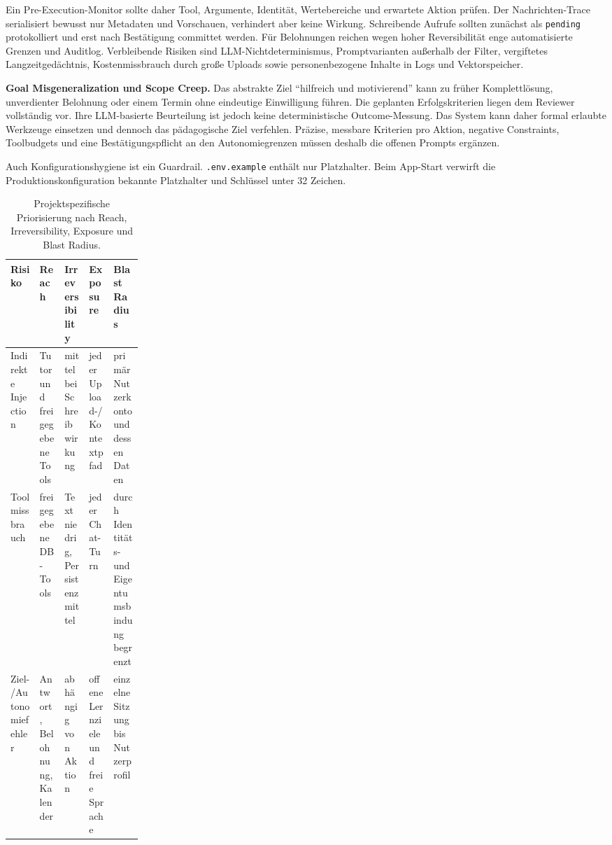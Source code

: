Ein Pre-Execution-Monitor sollte daher Tool, Argumente, Identität,
Wertebereiche und erwartete Aktion prüfen. Der Nachrichten-Trace serialisiert
bewusst nur Metadaten und Vorschauen, verhindert aber keine Wirkung. Schreibende
Aufrufe sollten zunächst als \texttt{pending} protokolliert und erst nach
Bestätigung committet werden. Für Belohnungen reichen wegen hoher Reversibilität
enge automatisierte Grenzen und Auditlog. Verbleibende Risiken sind
LLM-Nichtdeterminismus, Promptvarianten außerhalb der Filter, vergiftetes
Langzeitgedächtnis, Kostenmissbrauch durch große Uploads sowie personenbezogene
Inhalte in Logs und Vektorspeicher.

\textbf{Goal Misgeneralization und Scope Creep.} Das abstrakte Ziel
\enquote{hilfreich und motivierend} kann zu früher Komplettlösung,
unverdienter Belohnung oder einem Termin ohne eindeutige Einwilligung führen.
Die geplanten Erfolgskriterien liegen dem Reviewer vollständig vor. Ihre
LLM-basierte Beurteilung ist jedoch keine deterministische Outcome-Messung. Das
System kann daher formal erlaubte Werkzeuge einsetzen und dennoch das
pädagogische Ziel verfehlen. Präzise, messbare Kriterien pro Aktion,
negative Constraints, Toolbudgets und eine Bestätigungspflicht an den
Autonomiegrenzen müssen deshalb die offenen Prompts ergänzen.

Auch Konfigurationshygiene ist ein Guardrail. \texttt{.env.example} enthält nur
Platzhalter. Beim App-Start verwirft die Produktionskonfiguration bekannte
Platzhalter und Schlüssel unter 32 Zeichen.

\begin{table}[htbp]
  \centering
  \footnotesize
  \begin{tabularx}{\linewidth}{@{}p{0.22\linewidth}XXXX@{}}
    \toprule
    Risiko & Reach & Irreversibility & Exposure & Blast Radius \\
    \midrule
    Indirekte Injection & Tutor und freigegebene Tools & mittel bei
      Schreibwirkung & jeder Upload-/Kontextpfad & primär Nutzerkonto und
      dessen Daten \\
    Toolmissbrauch & freigegebene DB-Tools & Text niedrig, Persistenz mittel &
      jeder Chat-Turn & durch Identitäts- und Eigentumsbindung begrenzt \\
    Ziel-/Autonomiefehler & Antwort, Belohnung, Kalender & abhängig von Aktion &
      offene Lernziele und freie Sprache & einzelne Sitzung bis Nutzerprofil \\
    \bottomrule
  \end{tabularx}
  \caption{Projektspezifische Priorisierung nach Reach, Irreversibility,
    Exposure und Blast Radius.}
  \label{tab:safety-risk}
\end{table}

